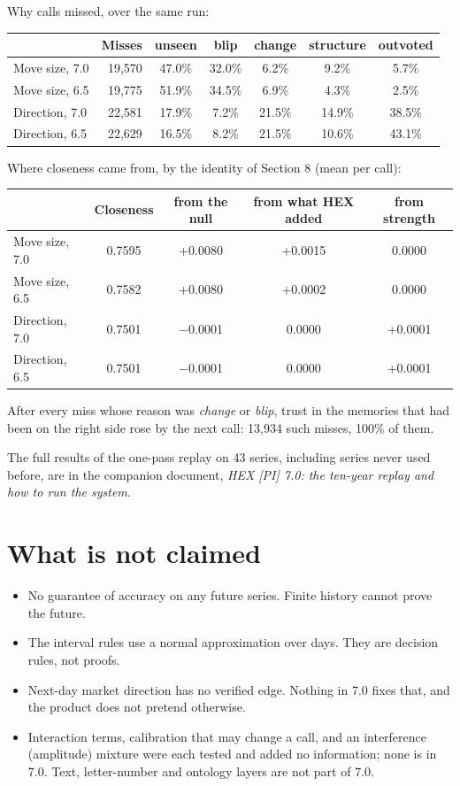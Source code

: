 \documentclass[10.5pt]{article}
\begin{document}
Why calls missed, over the same run:
\begin{center}\begin{tabular}{@{}lrccccc@{}}\toprule
 & Misses & unseen & blip & change & structure & outvoted\\\midrule
Move size, 7.0 & 19,570 & 47.0\% & 32.0\% & 6.2\% & 9.2\% & 5.7\%\\
Move size, 6.5 & 19,775 & 51.9\% & 34.5\% & 6.9\% & 4.3\% & 2.5\%\\
Direction, 7.0 & 22,581 & 17.9\% & 7.2\% & 21.5\% & 14.9\% & 38.5\%\\
Direction, 6.5 & 22,629 & 16.5\% & 8.2\% & 21.5\% & 10.6\% & 43.1\%\\
\bottomrule\end{tabular}\end{center}
Where closeness came from, by the identity of Section 8 (mean per call):
\begin{center}\begin{tabular}{@{}lcccc@{}}\toprule
 & Closeness & from the null & from what HEX added & from strength\\\midrule
Move size, 7.0 & 0.7595 & +0.0080 & +0.0015 & 0.0000\\
Move size, 6.5 & 0.7582 & +0.0080 & +0.0002 & 0.0000\\
Direction, 7.0 & 0.7501 & $-$0.0001 & 0.0000 & +0.0001\\
Direction, 6.5 & 0.7501 & $-$0.0001 & 0.0000 & +0.0001\\
\bottomrule\end{tabular}\end{center}
After every miss whose reason was \emph{change} or \emph{blip}, trust in the memories that had been on the right side rose by the next call: 13,934 such misses, 100\% of them.

The full results of the one-pass replay on 43 series, including series never used before, are in the companion document, \emph{HEX [PI] 7.0: the ten-year replay and how to run the system}.

\section{What is not claimed}
\begin{itemize}[leftmargin=1.2em,itemsep=1pt]
\item No guarantee of accuracy on any future series. Finite history cannot prove the future.
\item The interval rules use a normal approximation over days. They are decision rules, not proofs.
\item Next-day market direction has no verified edge. Nothing in 7.0 fixes that, and the product does not pretend otherwise.
\item Interaction terms, calibration that may change a call, and an interference (amplitude) mixture were each tested and added no information; none is in 7.0. Text, letter-number and ontology layers are not part of 7.0.
\end{itemize}
\end{document}
